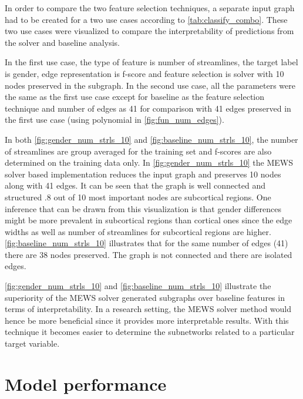 \documentclass[msthesis.tex]{subfiles}
\begin{document}
In order to compare the two feature selection techniques, a separate input graph had to be created for a two use cases according to \autoref{tab:classify_combo}. These two use cases were visualized to compare the interpretability of predictions from the solver and baseline analysis.

In the first use case, the type of feature is number of streamlines, the target label is gender, edge representation is f-score and feature selection is solver with 10 nodes preserved in the subgraph. In the second use case, all the parameters were the same as the first use case except for baseline as the feature selection technique and number of edges as 41 for comparison with 41 edges preserved in the first use case (using polynomial in \autoref{fig:fun_num_edges}). 

In both \autoref{fig:gender_num_strls_10} and \autoref{fig:baseline_num_strls_10},  the number of streamlines are group averaged for the training set and f-scores are also determined on the training data only. In \autoref{fig:gender_num_strls_10} the MEWS solver based implementation reduces the input graph and preserves 10 nodes along with 41 edges. It can be seen that the graph is well connected and structured .8 out of 10 most important nodes are subcortical regions. One inference that can be drawn from this visualization is that gender differences might be more prevalent in subcortical regions than cortical ones since the edge widths as well as number of streamlines for subcortical regions are higher. \autoref{fig:baseline_num_strls_10} illustrates that for the same number of edges (41) there are 38 nodes preserved. The graph is not connected and there are isolated edges. 

\autoref{fig:gender_num_strls_10} and \autoref{fig:baseline_num_strls_10} illustrate the superiority of the MEWS solver generated subgraphs over baseline features in terms of interpretability. In a research setting, the MEWS solver method would hence be more beneficial since it provides more interpretable results. With this technique it becomes easier to determine the subnetworks related to a particular target variable. 


\section{Model performance}
\end{document}
